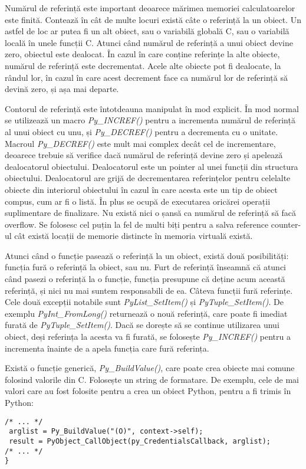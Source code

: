 Numărul de referință este important deoarece mărimea memoriei calculatoarelor este finită. Contează în cât de multe locuri există câte o referință la un obiect. Un astfel de loc ar putea fi un alt obiect, sau o variabilă globală C, sau o variabilă locală în unele funcții C. Atunci când numărul de referință a unui obiect devine zero, obiectul este dealocat. În cazul în care conține referințe la alte obiecte, numărul de referință este decrementat. Acele alte obiecte pot fi dealocate, la rândul lor, în cazul în care acest decrement face ca numărul lor de referință să devină zero, și așa mai departe.

Contorul de referință este întotdeauna manipulat în mod explicit. În mod normal se utilizează un macro \textit{Py\_INCREF()} pentru a incrementa numărul de referință al unui obiect cu unu, și \textit{Py\_DECREF()} pentru a decrementa cu o unitate. Macroul \textit{Py\_DECREF()} este mult mai complex decât cel de incrementare, deoarece trebuie să verifice dacă numărul de referință devine zero și apelează dealocatorul obiectului. Dealocatorul este un pointer al unei funcții din structura obiectului. Dealocatorul are grijă de decrementarea referințelor pentru celelalte obiecte din interiorul obiectului în cazul în care acesta este un tip de obiect compus, cum ar fi o listă. În plus se ocupă de executarea oricărei operații suplimentare de finalizare. Nu există nici o șansă ca numărul de referință să facă overflow. Se folosesc cel puțin la fel de multi biți pentru a salva reference counter-ul cât există locații de memorie distincte în memoria virtuală există.

Atunci când o funcție pasează o referință la un obiect, există două posibilități: funcția fură o referință la obiect, sau nu. Furt de referință înseamnă că atunci când pasezi o referință la o funcție, funcția presupune că deține acum această referință, și nici nu mai suntem responsabili de ea. Câteva funcții fură referințe. Cele două excepții notabile sunt \textit{PyList\_SetItem()} și \textit{PyTuple\_SetItem()}. De exemplu \textit{PyInt\_FromLong()} returnează o nouă referință, care poate fi imediat furată de \textit{PyTuple\_SetItem()}. Dacă se dorește să se continue utilizarea unui obiect, deși referința la acesta va fi furată, se folosește \textit{Py\_INCREF()} pentru a incrementa înainte de a apela funcția care fură referința.


Există o funcție generică, \textit{Py\_BuildValue()}, care poate crea obiecte mai comune folosind valorile din C. Folosește un string de formatare. De exemplu, cele de mai valori care au fost folosite pentru a crea un obiect Python, pentru a fi trimis în Python:
\lstset{language=C,frame=single, showstringspaces=false}
\begin{lstlisting}
/* ... */
 arglist = Py_BuildValue("(O)", context->self);
 result = PyObject_CallObject(py_CredentialsCallback, arglist);
/* ... */
}
\end{lstlisting}




